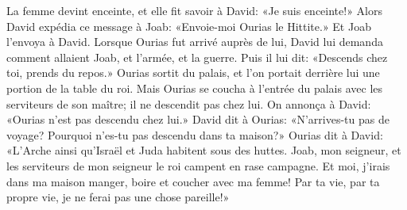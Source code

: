 La femme devint enceinte, et elle fit savoir à David: «Je suis enceinte!»
Alors David expédia ce message à Joab:
	«Envoie-moi Ourias le Hittite.»
	Et Joab l’envoya à David.
Lorsque Ourias fut arrivé auprès de lui,
	David lui demanda comment allaient Joab, et l’armée, et la guerre.
Puis il lui dit: «Descends chez toi, prends du repos.»
Ourias sortit du palais, et l’on portait derrière lui une portion de la table du roi.
Mais Ourias se coucha à l’entrée du palais avec les serviteurs de son maître;
	il ne descendit pas chez lui.
On annonça à David: «Ourias n’est pas descendu chez lui.»
David dit à Ourias:
	«N’arrives-tu pas de voyage? Pourquoi n’es-tu pas descendu dans ta maison?»
Ourias dit à David:
	«L’Arche ainsi qu’Israël et Juda habitent sous des huttes.
Joab, mon seigneur, et les serviteurs de mon seigneur le roi campent en rase campagne.
Et moi, j’irais dans ma maison manger, boire et coucher avec ma femme!
	Par ta vie, par ta propre vie, je ne ferai pas une chose pareille!»

